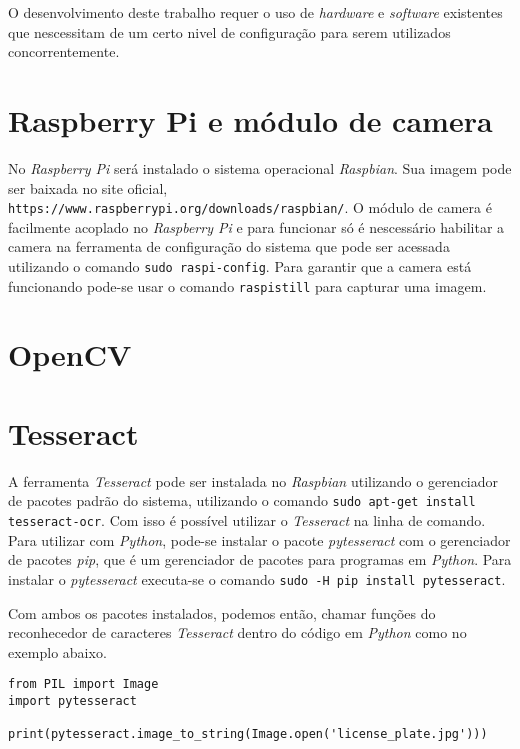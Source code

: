 O desenvolvimento deste trabalho requer o uso de \emph{hardware} e \emph{software} existentes 
que nescessitam de um certo nivel de configuração para serem utilizados concorrentemente.

\section{Raspberry Pi e módulo de camera}
\label{sec:confrpi}

No \emph{Raspberry Pi} será instalado o sistema operacional \emph{Raspbian}. Sua imagem pode ser baixada no 
site oficial, \texttt{https://www.raspberrypi.org/downloads/raspbian/}. O módulo de camera é facilmente acoplado no 
\emph{Raspberry Pi} e para funcionar só é nescessário habilitar a camera na ferramenta de configuração do sistema que pode 
ser acessada utilizando o comando \texttt{sudo raspi-config}. Para garantir que a camera está funcionando pode-se usar o 
comando \texttt{raspistill} para capturar uma imagem.

\section{OpenCV}
\label{sec:confopencv} 



\section{Tesseract}
\label{sec:conftess}

A ferramenta \emph{Tesseract} pode ser instalada no \emph{Raspbian} utilizando o gerenciador de pacotes padrão do sistema, 
utilizando o comando \texttt{sudo apt-get install tesseract-ocr}. Com isso é possível utilizar o \emph{Tesseract} na linha 
de comando. Para utilizar com \emph{Python}, pode-se instalar o pacote \emph{pytesseract} com o gerenciador de pacotes \emph{pip}, 
que é um gerenciador de pacotes para programas em \emph{Python}. Para instalar o \emph{pytesseract} executa-se o comando 
\texttt{sudo -H pip install pytesseract}.

Com ambos os pacotes instalados, podemos então, chamar funções do reconhecedor de caracteres \emph{Tesseract} dentro 
do código em \emph{Python} como no exemplo abaixo.

\begin{verbatim}
from PIL import Image
import pytesseract

print(pytesseract.image_to_string(Image.open('license_plate.jpg')))
\end{verbatim}
